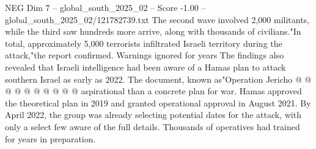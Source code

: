 \begin{textsample}{NEG Dim 7 – global\_south\_2025\_02 – Score -1.00 – global\_south\_2025\_02/121782739.txt}
The second wave involved 2,000 militants, while the third saw hundreds more arrive, along with thousands of civilians."In total, approximately 5,000 terrorists infiltrated Israeli territory during the attack,"the report confirmed.
Warnings ignored for years The findings also revealed that Israeli intelligence had been aware of a Hamas plan to attack southern Israel as early as 2022.
The document, known as"Operation Jericho @ @ @ @ @ @ @ @ @ @ aspirational than a concrete plan for war.
Hamas approved the theoretical plan in 2019 and granted operational approval in August 2021.
By April 2022, the group was already selecting potential dates for the attack, with only a select few aware of the full details.
Thousands of operatives had trained for years in preparation.

\end{textsample}
